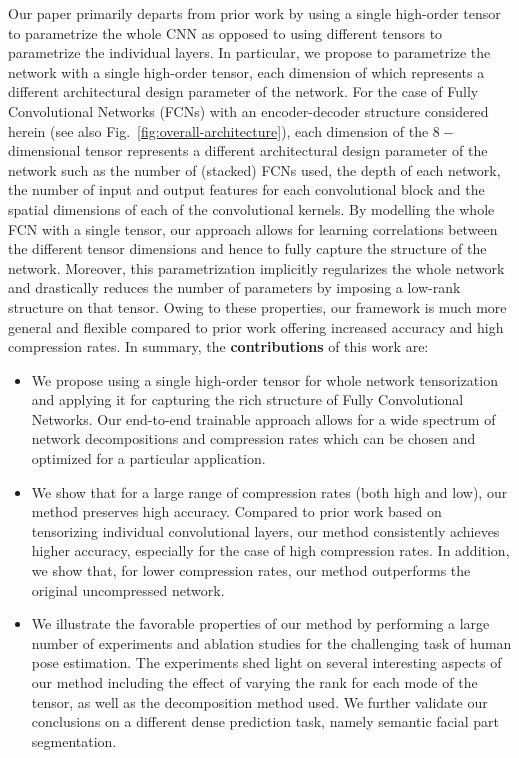 \documentclass[10pt,twocolumn,letterpaper]{article}
\begin{document}
Our paper primarily departs from prior work by using a single high-order tensor to parametrize the whole CNN as opposed to using different tensors to parametrize the individual layers. In particular, we propose to parametrize the network with a single high-order tensor, each dimension of which represents a different architectural design parameter of the network. For the case of Fully Convolutional Networks (FCNs) with an encoder-decoder structure considered herein (see also Fig.~\ref{fig:overall-architecture}), each dimension of the $8-$dimensional tensor represents a different architectural design parameter of the network such as the number of (stacked) FCNs used, the depth of each network, the number of input and output features for each convolutional block and the spatial dimensions of each of the convolutional kernels. By modelling the whole FCN with a single tensor, our approach allows for learning correlations between the different tensor dimensions and hence to fully capture the structure of the network. Moreover, this parametrization implicitly regularizes the whole network and drastically reduces the number of parameters by imposing a low-rank structure on that tensor. Owing to these properties, our framework is much more general and flexible compared to prior work offering increased accuracy and high compression rates.
In summary, the \textbf{contributions} of this work are:
\begin{itemize}
    \item 
    We propose using a single high-order tensor for whole network tensorization and applying it for capturing the rich structure of Fully Convolutional Networks. Our end-to-end trainable approach allows for a wide spectrum of network decompositions and compression rates which can be chosen and optimized for a particular application.
    \item
    We show that for a large range of compression rates (both high and low), our method preserves high accuracy. Compared to prior work based on tensorizing individual convolutional layers, our method consistently achieves higher accuracy, especially for the case of high compression rates. In addition, we show that, for lower compression rates, our method outperforms the original uncompressed network.
    \item
    We illustrate the favorable properties of our method by performing a large number of experiments and ablation studies for the challenging task of human pose estimation. The experiments shed light on several interesting aspects of our method including the effect of varying the rank for each mode of the tensor, as well as the decomposition method used. We further validate our conclusions on a different dense prediction task, namely semantic facial part segmentation.
\end{itemize}
\end{document}
